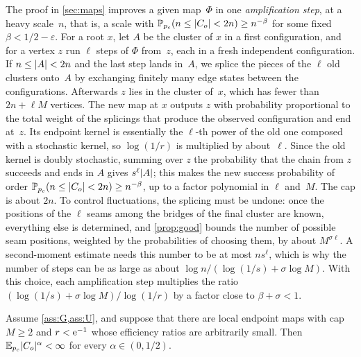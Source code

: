 The proof in \cref{sec:maps} improves a given map~$\Phi$ in one \emph{amplification step}, at a heavy
scale~$n$, that is, a scale with $\mathbb P_{p_c}(n\le\lvert C_o\rvert<2n)\ge n^{-\beta}$ for some fixed
$\beta<1/2-\varepsilon$. For a root $x$, let $A$ be the cluster of $x$ in a first configuration, and
for a vertex $z$ run $\ell$ steps of $\Phi$ from~$z$, each in a fresh independent configuration. If
$n\le\lvert A\rvert<2n$ and the last step lands in~$A$, we splice the pieces of the $\ell$ old clusters onto~$A$
by exchanging finitely many edge states between the configurations. Afterwards $z$ lies in the cluster
of~$x$, which has fewer than $2n+\ell M$ vertices. The new map at $x$ outputs $z$ with probability
proportional to the total weight of the splicings that produce the observed configuration and end
at~$z$. Its endpoint kernel is essentially the $\ell$-th power of the old one composed with a stochastic
kernel, so $\log(1/r)$ is multiplied by about~$\ell$. Since the old kernel is doubly stochastic, summing
over $z$ the probability that the chain from $z$ succeeds and ends in $A$ gives $s^\ell\lvert A\rvert$; this
makes the new success probability of order $\mathbb P_{p_c}(n\le\lvert C_o\rvert<2n)\ge n^{-\beta}$, up to a factor
polynomial in $\ell$ and~$M$. The cap is about $2n$. To control fluctuations, the splicing must be
undone: once the positions of the $\ell$ seams among the bridges of the final cluster are known,
everything else is determined, and \cref{prop:good} bounds the number of possible seam positions,
weighted by the probabilities of choosing them, by about $M^{\sigma\ell}$. A second-moment estimate
needs this number to be at most $ns^\ell$, which is why the number of steps can be as large as about
$\log n/(\log(1/s)+\sigma\log M)$. With this choice, each amplification step multiplies the ratio
$(\log(1/s)+\sigma\log M)/\log(1/r)$ by a factor close to $\beta+\sigma<1$.

\begin{proposition}\label{prop:efficient}
Assume \cref{ass:G,ass:U}, and suppose that there are local endpoint maps with cap $M\ge2$ and
$r<\mathrm{e}^{-1}$ whose efficiency ratios are arbitrarily small. Then
$\mathbb E_{p_c}\lvert C_o\rvert^\alpha<\infty$ for every $\alpha\in(0,1/2)$.
\end{proposition}

